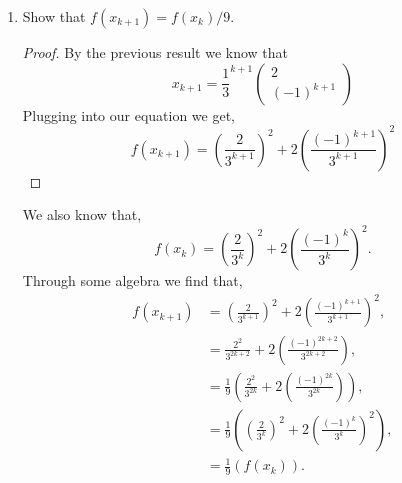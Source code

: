 \documentclass[12pt]{article}
\makeatletter
\theoremstyle{homework}
\newenvironment{exercise}[1]
{\def\@currentlabel{#1}\exercisecore}
{\endexercisecore}
\makeatother
\begin{document}
\begin{exercise}{2.3}
\begin{enumerate}
    \item[(ii)] Show that $f(x_{k + 1}) = f(x_k)/9$.
    \begin{proof} By the previous result we know that 
      \begin{equation*}
        x_{k + 1} = 
        \frac{1}{3}^{k + 1} \begin{pmatrix}
          2\\
          (-1)^{k + 1}
        \end{pmatrix}
      \end{equation*}
      Plugging into our equation we get, 
      \begin{equation*}
        f(x_{k + 1}) = \left(\frac{2}{3^{k + 1}}\right)^2 + 2\left(\frac{(-1)^{k + 1}}{3^{k + 1}}\right)^2
      \end{equation*}
    \end{proof}
    We also know that, 
    \begin{equation*}
      f(x_{k}) = \left(\frac{2}{3^{k}}\right)^2 + 2\left(\frac{(-1)^{k}}{3^{k}}\right)^2.
    \end{equation*}
    Through some algebra we find that, 
    \begin{align*}
      f(x_{k + 1}) &= \left(\frac{2}{3^{k + 1}}\right)^2 + 2\left(\frac{(-1)^{k + 1}}{3^{k + 1}}\right)^2,\\
      &= \frac{2^2}{3^{2k + 2}} + 2\left(\frac{(-1)^{2k + 2}}{3^{2k + 2}}\right),\\
      &= \frac{1}{9}\left(\frac{2^2}{3^{2k}} + 2\left(\frac{(-1)^{2k}}{3^{2k}}\right)\right),\\
      &= \frac{1}{9}\left(\left(\frac{2}{3^{k}}\right)^2 + 2\left(\frac{(-1)^{k}}{3^{k}}\right)^2\right),\\
      &= \frac{1}{9}\left(f(x_k)\right).
    \end{align*}
    \vspace{.15in}



\end{enumerate}
\end{exercise}
\end{document}
